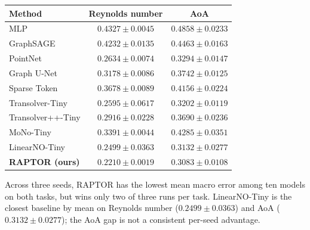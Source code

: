 \documentclass[a4paper,fleqn]{cas-sc}
\begin{document}
\begin{center}
    \begin{minipage}{0.80\linewidth}
        \centering
        \label{tab:airfrans_three_seed}
        \renewcommand{\arraystretch}{1.12}
        \setlength{\tabcolsep}{7pt}
        \small
        \begin{tabular}{@{}lcc@{}}
            \toprule
            Method & Reynolds number & AoA \\
            \midrule
            MLP & \(0.4327\pm0.0045\) & \(0.4858\pm0.0233\) \\
            GraphSAGE & \(0.4232\pm0.0135\) & \(0.4463\pm0.0163\) \\
            PointNet & \(0.2634\pm0.0074\) & \(0.3294\pm0.0147\) \\
            Graph U-Net & \(0.3178\pm0.0086\) & \(0.3742\pm0.0125\) \\
            Sparse Token & \(0.3678\pm0.0089\) & \(0.4156\pm0.0224\) \\
            Transolver-Tiny & \(0.2595\pm0.0617\) & \(0.3202\pm0.0119\) \\
            Transolver++-Tiny & \(0.2916\pm0.0228\) & \(0.3690\pm0.0236\) \\
            MoNo-Tiny & \(0.3391\pm0.0044\) & \(0.4285\pm0.0351\) \\
            LinearNO-Tiny & \(0.2499\pm0.0363\) & \(0.3132\pm0.0277\) \\
            \midrule
            \textbf{RAPTOR (ours)} &
            \(\mathbf{0.2210\pm0.0019}\) &
            \(\mathbf{0.3083\pm0.0108}\) \\
            \bottomrule
        \end{tabular}
    \end{minipage}
\end{center}

Across three seeds, RAPTOR has the lowest mean macro error among ten
models on both tasks, but wins only two of three runs per task.
LinearNO-Tiny is the closest baseline by mean on Reynolds number
(\(0.2499\pm0.0363\)) and AoA (\(0.3132\pm0.0277\)); the AoA gap
is not a consistent per-seed advantage.
\end{document}
